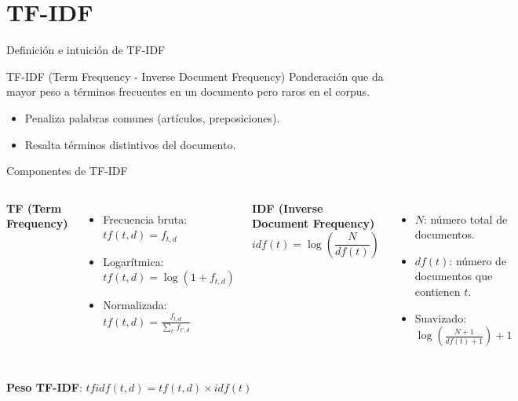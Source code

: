 \documentclass[aspectratio=169, 10pt, xcolor=table]{beamer}
\begin{document}
\section{TF-IDF}

\begin{frame}{Definición e intuición de TF-IDF}
    \begin{block}{TF-IDF (Term Frequency - Inverse Document Frequency)}
        Ponderación que da mayor peso a términos frecuentes en un documento pero raros en el corpus.
    \end{block}
    \begin{itemize}
        \item Penaliza palabras comunes (artículos, preposiciones).
        \item Resalta términos distintivos del documento.
    \end{itemize}
\end{frame}

\begin{frame}{Componentes de TF-IDF}
    \begin{columns}[t]
        \textbf{TF (Term Frequency)}
        \begin{itemize}
            \item Frecuencia bruta: $tf(t,d) = f_{t,d}$
            \item Logarítmica: $tf(t,d) = \log(1 + f_{t,d})$
            \item Normalizada: $tf(t,d) = \frac{f_{t,d}}{\sum_{t'} f_{t',d}}$
        \end{itemize}
        \textbf{IDF (Inverse Document Frequency)}
        \[
        idf(t) = \log\left(\frac{N}{df(t)}\right)
        \]
        \begin{itemize}
            \item $N$: número total de documentos.
            \item $df(t)$: número de documentos que contienen $t$.
            \item Suavizado: $\log\left(\frac{N+1}{df(t)+1}\right) + 1$
        \end{itemize}
    \end{columns}
    \vspace{0.3cm}
    \textbf{Peso TF-IDF}: $tfidf(t,d) = tf(t,d) \times idf(t)$
\end{frame}
\end{document}

